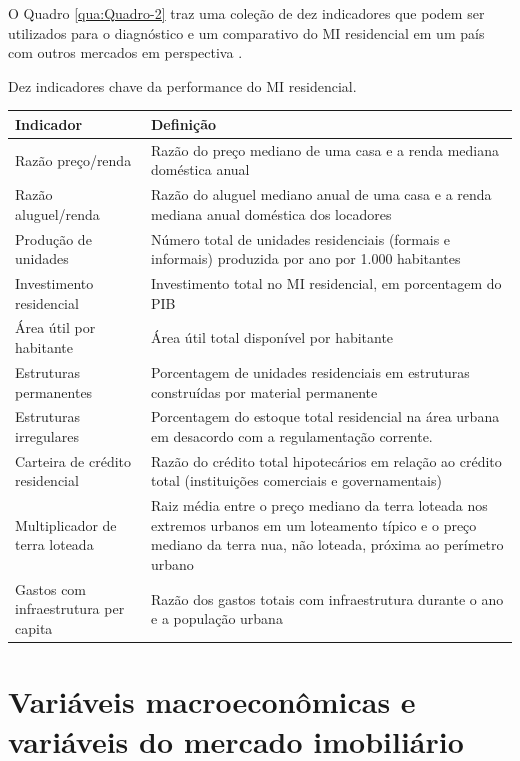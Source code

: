 \documentclass[
	12pt,				%
	oneside,			%
	a4paper,			%
	chapter=TITLE,		%
	section=TITLE,		%
	english,			%
	brazil				%
	]{abntex2}
\begin{document}
O Quadro \ref{qua:Quadro-2} traz uma coleção de dez indicadores que podem
ser utilizados para o diagnóstico e um comparativo do \gls{MI} residencial em
um país com outros mercados em perspectiva \autocite[7]{indicators}.
\begin{quadro}[htb]
	\centering
	\caption{\label{qua:Quadro-2}Dez indicadores chave da performance do \gls{MI} residencial.}	
	\begin{tabular}{|p{5cm}|p{10cm}|}
		\hline
		\textbf{Indicador}        & \textbf{Definição}\\ \hline
		 Razão preço/renda        & Razão do preço mediano de uma casa e a renda 
		 mediana doméstica anual  \\ \hline
		 Razão aluguel/renda      & Razão do aluguel mediano anual de uma casa e a 
		 renda mediana anual doméstica dos locadores       \\ \hline
		 Produção de unidades     & Número total de unidades residenciais (formais e 
		 informais) produzida por ano por 1.000 habitantes       \\ \hline
		 Investimento residencial & Investimento total no \gls{MI} residencial, em 
		 porcentagem do \gls{PIB}       \\ \hline
		 Área útil por habitante  & Área útil total disponível por habitante       \\ \hline
		 Estruturas permanentes   & Porcentagem de unidades residenciais em 
		 estruturas construídas por material permanente       \\ \hline
		 Estruturas irregulares   & Porcentagem do estoque total residencial na área 
		 urbana em desacordo com a regulamentação corrente.       \\ \hline
		 Carteira de crédito residencial & Razão do crédito total hipotecários em 
		 relação ao crédito total (instituições comerciais e governamentais)       \\ \hline
		 Multiplicador de terra loteada & Raiz média entre o preço mediano da terra 
		 loteada nos extremos urbanos em um loteamento típico e o preço mediano da 
		 terra nua, não loteada, próxima ao perímetro urbano       \\ \hline
		 Gastos com infraestrutura per capita & Razão dos gastos totais com 
		 infraestrutura durante o ano e a população urbana       \\ \hline
	\end{tabular}
\end{quadro}
\hypertarget{variuxe1veis-macroeconuxf4micas-e-variuxe1veis-do-mercado-imobiliuxe1rio}{%
\section{Variáveis macroeconômicas e variáveis do mercado imobiliário}\label{variuxe1veis-macroeconuxf4micas-e-variuxe1veis-do-mercado-imobiliuxe1rio}}
\end{document}
